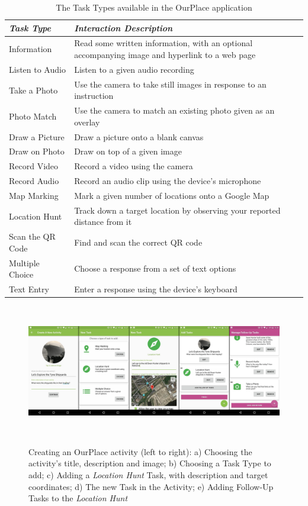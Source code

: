 \documentclass[,hyphens]{sigchi}
\begin{document}
\begin{table}
  \centering
  \begin{tabular}{l|p{50mm}}
    {\small\textit{Task Type}}
    & {\small \textit{Interaction Description}} \\
    \midrule
    Information & Read some written information, with an optional accompanying image and hyperlink to a web page \\
    Listen to Audio & Listen to a given audio recording \\
    Take a Photo & Use the camera to take still images in response to an instruction \\
    Photo Match & Use the camera to match an existing photo given as an overlay \\
    Draw a Picture & Draw a picture onto a blank canvas \\
    Draw on Photo & Draw on top of a given image \\
    Record Video & Record a video using the camera \\
    Record Audio & Record an audio clip using the device's microphone \\
    Map Marking & Mark a given number of locations onto a Google Map \\
    Location Hunt & Track down a target location by observing your reported distance from it \\
    Scan the QR Code & Find and scan the correct QR code \\
    Multiple Choice & Choose a response from a set of text options \\
    Text Entry & Enter a response using the device's keyboard
  \end{tabular}
  \caption{The Task Types available in the OurPlace application}~\label{tab:TaskTypes}
\end{table}

\begin{figure}
  \centering
  \includegraphics[width=2.1\columnwidth]{figures/activityCreation}
  \caption{Creating an OurPlace activity (left to right): a) Choosing the activity's title, description and image; b) Choosing a Task Type to add; c) Adding a \textit{Location Hunt} Task, with description and target coordinates; d) The new Task in the Activity; e) Adding Follow-Up Tasks to the \textit{Location Hunt}  }~\label{fig:ActivityCreation}
\end{figure}
\end{document}
